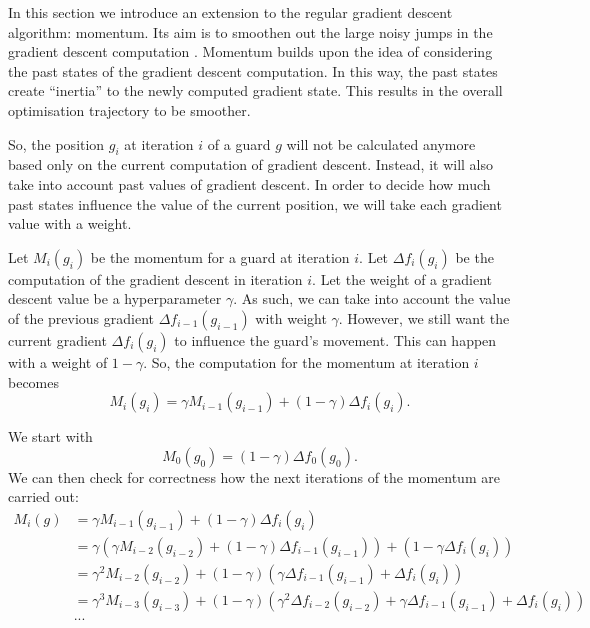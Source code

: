 In this section we introduce an extension to the regular gradient descent algorithm: momentum. Its aim is to smoothen out the large noisy jumps in the gradient descent computation \cite{goodfelow2016deep}. Momentum builds upon the idea of considering the past states of the gradient descent computation. In this way, the past states create ``inertia'' to the newly computed gradient state. This results in the overall optimisation trajectory to be smoother.

So, the position $g_i$ at iteration $i$ of a guard $g$ will not be calculated anymore based only on the current computation of gradient descent. Instead, it will also take into account past values of gradient descent. In order to decide how much past states influence the value of the current position, we will take each gradient value with a weight.

Let $M_i(g_i)$ be the momentum for a guard at iteration $i$. Let $\Delta f_i(g_i)$ be the computation of the gradient descent in iteration $i$. Let the weight of a gradient descent value be a hyperparameter $\gamma$. 
As such, we can take into account the value of the previous gradient $\Delta f_{i - 1}(g_{i - 1})$ with weight $\gamma$. However, we still want the current gradient $\Delta f_i(g_i)$ to influence the guard's movement. This can happen with a weight of $1 - \gamma$. So, the computation for the momentum at iteration $i$ becomes $$M_i(g_i) = \gamma M_{i - 1}(g_{i - 1}) + (1 - \gamma)\Delta f_i(g_i).$$

We start with $$M_0(g_0) = (1 - \gamma) \Delta f_0(g_0).$$
We can then check for correctness how  the next iterations of the momentum are carried out:
\begin{align*}
    M_i(g) &= \gamma M_{i - 1}(g_{i - 1}) + (1 - \gamma) \Delta f_i(g_i) \\
        &= \gamma (\gamma M_{i - 2}(g_{i - 2}) + (1 - \gamma) \Delta f_{i - 1}(g_{i - 1})) + (1 - \gamma \Delta f_i(g_i)) \\ 
        &= \gamma^2 M_{i - 2}(g_{i - 2}) + (1 - \gamma)(\gamma \Delta f_{i - 1}(g_{i - 1}) + \Delta f_i(g_i)) \\
        &= \gamma^3 M_{i - 3}(g_{i - 3}) + (1 - \gamma)(\gamma^2 \Delta f_{i - 2}(g_{i - 2}) + \gamma \Delta f_{i - 1}(g_{i - 1}) + \Delta f_i(g_i)) \\
        &...
\end{align*}

